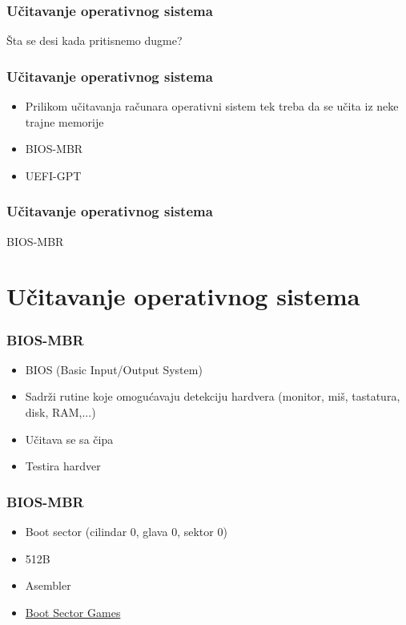 \documentclass{beamer}
\begin{document}
\begin{frame}
    \frametitle{Učitavanje operativnog sistema}
    \begin{center}
        \large{Šta se desi kada pritisnemo dugme?}
    \end{center}
\end{frame}

\begin{frame}
    \frametitle{Učitavanje operativnog sistema}
    \begin{itemize}
        \item Prilikom učitavanja računara operativni sistem tek treba da se učita iz neke trajne memorije \newline
        \item BIOS-MBR
        \item UEFI-GPT
    \end{itemize}
\end{frame}

\begin{frame}
    \frametitle{Učitavanje operativnog sistema}
    \begin{center}
        \large{BIOS-MBR}
    \end{center}
\end{frame}

\section*{Učitavanje operativnog sistema}
\begin{frame}
    \frametitle{BIOS-MBR}
    \begin{itemize}
        \item BIOS (Basic Input/Output System) \newline
        \item Sadrži rutine koje omogućavaju detekciju hardvera (monitor, miš, tastatura, disk, RAM,...) \newline
        \item Učitava se sa čipa \newline
        \item Testira hardver
    \end{itemize}
\end{frame}

\begin{frame}
    \frametitle{BIOS-MBR}
    \begin{itemize}
        \item Boot sector (cilindar 0, glava 0, sektor 0) \newline
        \item 512B \newline
        \item Asembler \newline
        \item \href{https://youtu.be/1UzTf0Qo37A}{Boot Sector Games}
    \end{itemize}
\end{frame}
\end{document}
